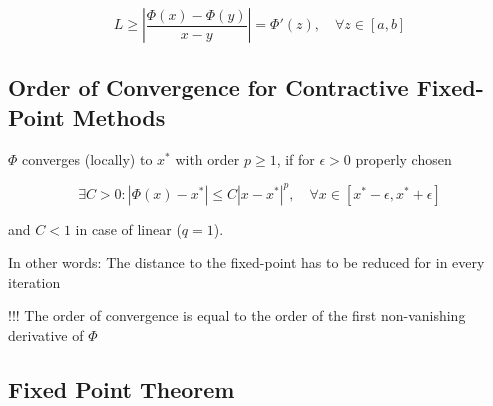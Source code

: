 \documentclass[
    a4paper,
    11pt
]{article}
\begin{document}
\begin{equation}
    L \geq \left| \frac{\Phi(x) - \Phi(y)}{x - y} \right| = \Phi'(z), \quad
    \forall z \in [a,b]
\end{equation}

\subsection{Order of Convergence for Contractive Fixed-Point Methods}

$\Phi$ converges (locally) to $x^*$ with order $p \geq 1 $, if for $\epsilon > 0
$ properly chosen

\begin{equation}
    \exists C > 0 : |\Phi(x) - x^*| \leq C |x - x^*|^p, \quad \forall x \in [x^*
    - \epsilon, x^* + \epsilon]
\end{equation}

and $C < 1$ in case of linear ($q = 1$).

In other words: The distance to the fixed-point has to be reduced for in every
iteration

!!! The order of convergence is equal to the order of the first non-vanishing
derivative of $\Phi$

\subsection{Fixed Point Theorem}
\end{document}

